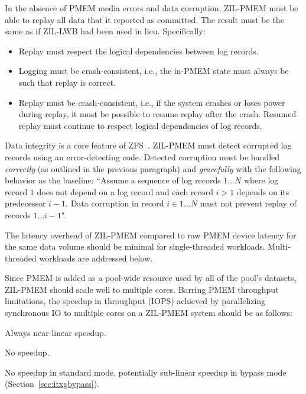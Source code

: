 \documentclass[12pt,a4paper,twoside]{book}
\begin{document}
{
In the absence of PMEM media errors and data corruption, ZIL-PMEM must be able to replay all data that it reported as committed.
The result must be the same as if ZIL-LWB had been used in lieu.
Specifically:
\begin{itemize}[noitemsep,beginpenalty=100000,midpenalty=100000]
    \item Replay must respect the logical dependencies between log records.
    \item Logging must be crash-consistent, i.e., the in-PMEM state must always be such that replay is correct.
    \item Replay must be crash-consistent, i.e., if the system crashes or loses power during replay, it must be possible to resume replay after the crash.
        Resumed replay must continue to respect logical dependencies of log records.
\end{itemize}

Data integrity is a core feature of ZFS~\cite{bonwickZettabyteFileSystem2003}.
ZIL-PMEM must detect corrupted log records using an error-detecting code.
Detected corruption must be handled \textit{correctly} (as outlined in the previous paragraph) and \textit{gracefully} with the following behavior as the baseline:
``Assume a sequence of log records $1 \dots N$ where log record $1$ does not depend on a log record and each record $i > 1$ depends on its predecessor $i-1$.
Data corruption in record $i \in 1 \dots N$ must not prevent replay of records $1 \dots i-1$".

The latency overhead of ZIL-PMEM compared to raw PMEM device latency for the same data volume should be minimal for single-threaded workloads.
Multi-threaded workloads are addressed below.

Since PMEM is added as a pool-wide resource used by all of the pool's datasets, ZIL-PMEM should scale well to multiple cores.
Barring PMEM throughput limitations, the speedup in throughput (IOPS) achieved by parallelizing synchronous IO to multiple cores on a ZIL-PMEM system should be as follows:
{
\setlength{\parskip}{0pt}
\begin{description}[topsep=0pt, noitemsep, leftmargin=1cm, labelindent=1cm, widest=1 private dataset per thread]
    \item[1 private dataset per thread] Always near-linear speedup.
    \item[1 shared dataset] \mbox{}
          \begin{description}[noitemsep, leftmargin=1cm, labelindent=1cm, widest=ZPL filesystem]
              \item[ZPL filesystem] No speedup.
              \item[ZVOL] No speedup in standard mode, potentially sub-linear speedup in bypass mode (Section~\ref{sec:itxgbypass}).
          \end{description}
\end{description}
}

}
\end{document}
